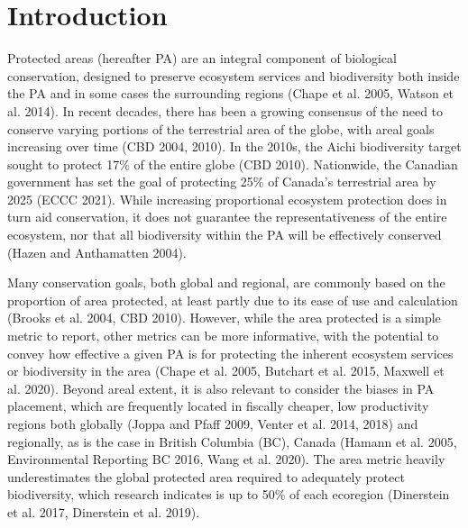 \documentclass[11pt]{article}
\begin{document}
\vfill

\clearpage
\linenumbers
\pagestyle{normal}

\hypertarget{introduction}{%
\section{Introduction}\label{introduction}}

Protected areas (hereafter PA) are an integral component of biological
conservation, designed to preserve ecosystem services and biodiversity
both inside the PA and in some cases the surrounding regions (Chape et
al. 2005, Watson et al. 2014). In recent decades, there has been a
growing consensus of the need to conserve varying portions of the
terrestrial area of the globe, with areal goals increasing over time
(CBD 2004, 2010). In the 2010s, the Aichi biodiversity target sought to
protect 17\% of the entire globe (CBD 2010). Nationwide, the Canadian
government has set the goal of protecting 25\% of Canada's terrestrial
area by 2025 (ECCC 2021). While increasing proportional ecosystem
protection does in turn aid conservation, it does not guarantee the
representativeness of the entire ecosystem, nor that all biodiversity
within the PA will be effectively conserved (Hazen and Anthamatten
2004).

Many conservation goals, both global and regional, are commonly based on
the proportion of area protected, at least partly due to its ease of use
and calculation (Brooks et al. 2004, CBD 2010). However, while the area
protected is a simple metric to report, other metrics can be more
informative, with the potential to convey how effective a given PA is
for protecting the inherent ecosystem services or biodiversity in the
area (Chape et al. 2005, Butchart et al. 2015, Maxwell et al. 2020).
Beyond areal extent, it is also relevant to consider the biases in PA
placement, which are frequently located in fiscally cheaper, low
productivity regions both globally (Joppa and Pfaff 2009, Venter et al.
2014, 2018) and regionally, as is the case in British Columbia (BC),
Canada (Hamann et al. 2005, Environmental Reporting BC 2016, Wang et al.
2020). The area metric heavily underestimates the global protected area
required to adequately protect biodiversity, which research indicates is
up to 50\% of each ecoregion (Dinerstein et al. 2017, Dinerstein et al.
2019).
\end{document}
